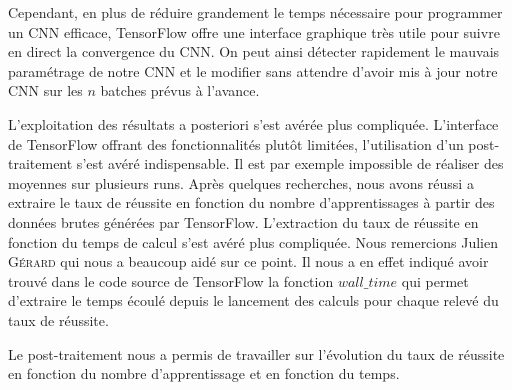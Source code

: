 Cependant, en plus de réduire grandement le temps nécessaire pour programmer un CNN efficace, TensorFlow offre une interface graphique très utile pour suivre en direct la convergence du CNN. On peut ainsi détecter rapidement le mauvais paramétrage de notre CNN et le modifier sans attendre d'avoir mis à jour notre CNN sur les $n$ batches prévus à l'avance.


L'exploitation des résultats a posteriori s'est avérée plus compliquée. L'interface de TensorFlow offrant des fonctionnalités plutôt limitées, l'utilisation d'un post-traitement s'est avéré indispensable. Il est par exemple impossible de réaliser des moyennes sur plusieurs runs. Après quelques recherches, nous avons réussi a extraire le taux de réussite en fonction du nombre d'apprentissages à partir des données brutes générées par TensorFlow. L'extraction du taux de réussite en fonction du temps de calcul s'est avéré plus compliquée. Nous remercions Julien \textsc{Gérard} qui nous a beaucoup aidé sur ce point. Il nous a en effet indiqué avoir trouvé dans le code source de TensorFlow la fonction $wall\_time$ qui permet d'extraire le temps écoulé depuis le lancement des calculs pour chaque relevé du taux de réussite.

Le post-traitement nous a permis de travailler sur l'évolution du taux de réussite en fonction du nombre d'apprentissage et en fonction du temps.

